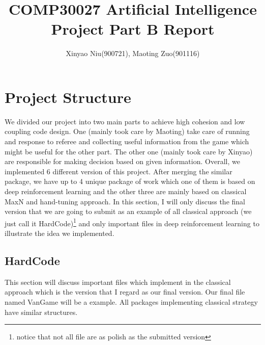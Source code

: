 \documentclass[11pt]{article}
\title{COMP30027 Artificial Intelligence Project Part B Report}
\author{Xinyao Niu(900721), Maoting Zuo(901116)}
\begin{document}
\maketitle


\section{Project Structure}

We divided our project into two main parts to achieve high cohesion and low coupling code design.
One (mainly took care by Maoting) take care of running and response to referee and collecting 
useful information from the game which might be useful for the other part.
The other one (mainly took care by Xinyao) are responsible for making decision based on given information.
Overall, we implemented 6 different version of this project. After merging the similar package, we have 
up to 4 unique package of work which one of them is based on deep reinforcement learning and the other three are
mainly based on classical MaxN and hand-tuning approach. 
In this section, I will only discuss the final version that we are going to submit as an example of all classical
approach (we just call it HardCode)\footnote{notice that not all file are as polish as the submitted version}
and only important files in deep reinforcement learning to illustrate the idea we implemented.

\subsection{HardCode}

This section will discuss important files which implement in the classical approach which is 
the version that I regard as our final version.
Our final file named VanGame will be a example.
All packages implementing classical strategy have similar structures.
\end{document}
